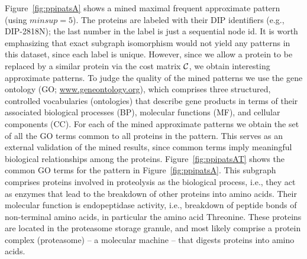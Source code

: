\smallskip{}
Figure~\ref{fig:ppipatsA} shows a mined
maximal frequent approximate pattern (using $minsup=5$). The proteins
are labeled with their DIP identifiers (e.g., DIP-2818N); the last
number in the label is just a sequential node id.  It is worth
emphasizing that exact subgraph isomorphism would not yield any patterns
in this dataset, since each label is unique. However, since we allow a
protein to be replaced by a similar protein via the cost matrix $\mathcal{C}$,
we obtain interesting approximate patterns. 
To judge the quality of the
mined patterns we use the gene ontology (GO;
\url{www.geneontology.org}), which comprises three structured,
controlled vocabularies (ontologies) that describe gene products in
terms of their associated biological processes (BP), molecular functions
(MF), and cellular components (CC).  For each of the mined approximate
patterns we obtain the set of all the GO terms common to all proteins in
the pattern. This serves as an external validation of the mined results,
since common terms imply meaningful biological relationships among the
proteins.  Figure~\ref{fig:ppipatsAT} shows the common GO terms for
the pattern in Figure~\ref{fig:ppipatsA}.  
This subgraph comprises proteins involved in proteolysis
as the biological process, i.e., they act as enzymes that lead to the
breakdown of other proteins into amino acids. Their molecular function
is endopeptidase activity, i.e., breakdown of peptide bonds of
non-terminal amino acids, in particular the amino acid Threonine.  These
proteins are located in the proteasome storage granule, and most likely
comprise a protein complex (proteasome) -- a molecular machine --
that digests proteins into amino acids.  
